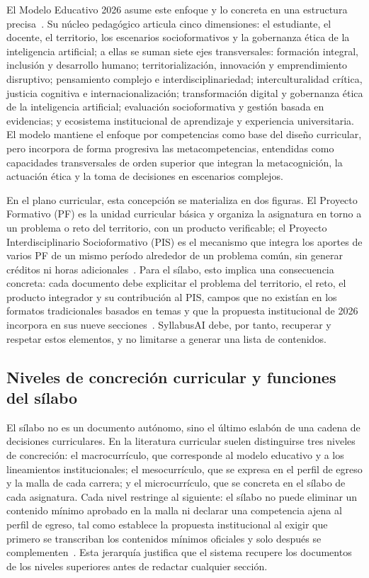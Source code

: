 El Modelo Educativo 2026 asume este enfoque y lo concreta en una estructura precisa~\cite{uti2026modelo}. Su núcleo pedagógico articula cinco dimensiones: el estudiante, el docente, el territorio, los escenarios socioformativos y la gobernanza ética de la inteligencia artificial; a ellas se suman siete ejes transversales: formación integral, inclusión y desarrollo humano; territorialización, innovación y emprendimiento disruptivo; pensamiento complejo e interdisciplinariedad; interculturalidad crítica, justicia cognitiva e internacionalización; transformación digital y gobernanza ética de la inteligencia artificial; evaluación socioformativa y gestión basada en evidencias; y ecosistema institucional de aprendizaje y experiencia universitaria. El modelo mantiene el enfoque por competencias como base del diseño curricular, pero incorpora de forma progresiva las metacompetencias, entendidas como capacidades transversales de orden superior que integran la metacognición, la actuación ética y la toma de decisiones en escenarios complejos.

En el plano curricular, esta concepción se materializa en dos figuras. El Proyecto Formativo (PF) es la unidad curricular básica y organiza la asignatura en torno a un problema o reto del territorio, con un producto verificable; el Proyecto Interdisciplinario Socioformativo (PIS) es el mecanismo que integra los aportes de varios PF de un mismo período alrededor de un problema común, sin generar créditos ni horas adicionales~\cite{uti2026modelo}. Para el sílabo, esto implica una consecuencia concreta: cada documento debe explicitar el problema del territorio, el reto, el producto integrador y su contribución al PIS, campos que no existían en los formatos tradicionales basados en temas y que la propuesta institucional de 2026 incorpora en sus nueve secciones~\cite{uti2026propuesta}. SyllabusAI debe, por tanto, recuperar y respetar estos elementos, y no limitarse a generar una lista de contenidos.

\subsection{Niveles de concreción curricular y funciones del sílabo}
El sílabo no es un documento autónomo, sino el último eslabón de una cadena de decisiones curriculares. En la literatura curricular suelen distinguirse tres niveles de concreción: el macrocurrículo, que corresponde al modelo educativo y a los lineamientos institucionales; el mesocurrículo, que se expresa en el perfil de egreso y la malla de cada carrera; y el microcurrículo, que se concreta en el sílabo de cada asignatura. Cada nivel restringe al siguiente: el sílabo no puede eliminar un contenido mínimo aprobado en la malla ni declarar una competencia ajena al perfil de egreso, tal como establece la propuesta institucional al exigir que primero se transcriban los contenidos mínimos oficiales y solo después se complementen~\cite{uti2026propuesta}. Esta jerarquía justifica que el sistema recupere los documentos de los niveles superiores antes de redactar cualquier sección.

